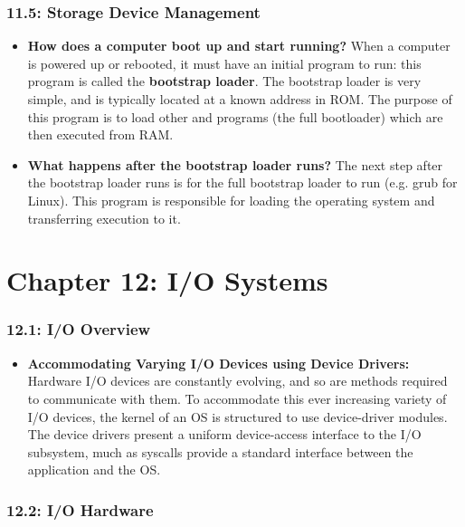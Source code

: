 \documentclass[12pt]{article}
\begin{document}
\section*{11.5: Storage Device Management}

\begin{itemize}
    \item \textbf{How does a computer boot up and start running?} When a computer is powered up or rebooted, it must have an initial program to run: this program is called the \textbf{bootstrap loader}. The bootstrap loader is very simple, and is typically located at a known address in ROM. The purpose of this program is to load other and programs (the full bootloader) which are then executed from RAM.
    \item \textbf{What happens after the bootstrap loader runs?} The next step after the bootstrap loader runs is for the full bootstrap loader to run (e.g. grub for Linux). This program is responsible for loading the operating system and transferring execution to it.
\end{itemize}

\part*{Chapter 12: I/O Systems}

\section*{12.1: I/O Overview}

\begin{itemize}
    \item \textbf{Accommodating Varying I/O Devices using Device Drivers:} Hardware I/O devices are constantly evolving, and so are methods required to communicate with them. To accommodate this ever increasing variety of I/O devices, the kernel of an OS is structured to use device-driver modules. The device drivers present a uniform device-access interface to the I/O subsystem, much as syscalls provide a standard interface between the application and the OS.
\end{itemize}

\section*{12.2: I/O Hardware}
\end{document}

